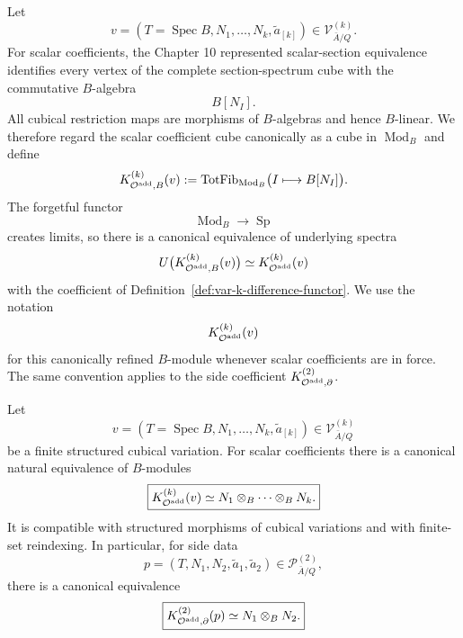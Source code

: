 \begin{convention}
\label{conv:var-scalar-cubical-module-fibre}
Let
\[
    v=(T=\operatorname{Spec}B,N_1,\ldots,N_k,\widetilde a_{[k]})
    \in
    \mathcal V^{(k)}_{\bar A/Q}.
\]
For scalar coefficients, the Chapter 10 represented scalar-section equivalence identifies every vertex of the complete section-spectrum cube with the commutative \(B\)-algebra
\[
    B[N_I].
\]
All cubical restriction maps are morphisms of \(B\)-algebras and hence \(B\)-linear.  We therefore regard the scalar coefficient cube canonically as a cube in \(\operatorname{Mod}_B\) and define
\[
    K_{\mathcal O^{\mathrm{add}},B}^{(k)}(v)
    :=
    \operatorname{TotFib}_{\operatorname{Mod}_B}
    \bigl(I\longmapsto B[N_I]\bigr).
\]
The forgetful functor
\[
    \operatorname{Mod}_B\longrightarrow\operatorname{Sp}
\]
creates limits, so there is a canonical equivalence of underlying spectra
\[
    U\bigl(K_{\mathcal O^{\mathrm{add}},B}^{(k)}(v)\bigr)
    \simeq
    K_{\mathcal O^{\mathrm{add}}}^{(k)}(v)
\]
with the coefficient of Definition~\ref{def:var-k-difference-functor}.  We use the notation
\[
    K_{\mathcal O^{\mathrm{add}}}^{(k)}(v)
\]
for this canonically refined \(B\)-module whenever scalar coefficients are in force.  The same convention applies to the side coefficient \(K^{(2)}_{\mathcal O^{\mathrm{add}},\partial}\).
\end{convention}

\begin{proposition}
\label{prop:var-scalar-cubical-total-fibre}
Let
\[
    v=(T=\operatorname{Spec}B,N_1,\ldots,N_k,\widetilde a_{[k]})
    \in
    \mathcal V^{(k)}_{\bar A/Q}
\]
be a finite structured cubical variation.  For scalar coefficients there is a canonical natural equivalence of \(B\)-modules
\[
    \boxed{
    K_{\mathcal O^{\mathrm{add}}}^{(k)}(v)
    \simeq
    N_1\otimes_B\cdots\otimes_BN_k.
    }
\]
It is compatible with structured morphisms of cubical variations and with finite-set reindexing.  In particular, for side data
\[
    p=(T,N_1,N_2,\widetilde a_1,\widetilde a_2)
    \in\mathcal P^{(2)}_{\bar A/Q},
\]
there is a canonical equivalence
\[
    \boxed{
    K^{(2)}_{\mathcal O^{\mathrm{add}},\partial}(p)
    \simeq
    N_1\otimes_BN_2.
    }
\]
\end{proposition}

